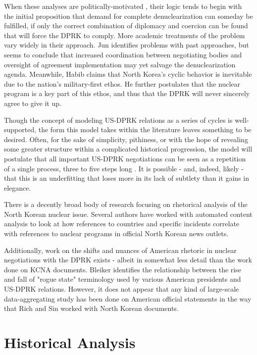 \documentclass{article}
\begin{document}
When these analyses are politically-motivated \cite{blair, cfr}, their logic tends to begin with the initial proposition that demand for complete denuclearization can someday be fulfilled, if only the correct combination of diplomacy and coercion can be found that will force the DPRK to comply. More academic treatments of the problem \cite{habib,jun} vary widely in their approach. Jun \cite{jun} identifies problems with past approaches, but seems to conclude that increased coordination between negotiating bodies and oversight of agreement implementation may yet salvage the denuclearization agenda. Meanwhile, Habib \cite{habib} claims that North Korea’s cyclic behavior is inevitable due to the nation’s military-first ethos. He further postulates that the nuclear program is a key part of this ethos, and thus that the DPRK will never sincerely agree to give it up.

Though the concept of modeling US-DPRK relations as a series of cycles is well-supported, the form this model takes within the literature leaves something to be desired. Often, for the sake of simplicity, pithiness, or with the hope of revealing some greater structure within a complicated historical progression, the model will postulate that all important US-DPRK negotiations can be seen as a repetition of a single process, three to five steps long \cite{fisher,jun}. It is possible - and, indeed, likely - that this is an underfitting that loses more in its lack of subtlety than it gains in elegance.

There is a decently broad body of research focusing on rhetorical analysis of the North Korean nuclear issue. Several authors \cite{rich12, rich14, sin} have worked with automated content analysis to look at how references to countries and specific incidents correlate with references to nuclear programs in official North Korean news outlets.

Additionally, work on the shifts and nuances of American rhetoric in nuclear negotiations with the DPRK exists - albeit in somewhat less detail than the work done on KCNA documents. Bleiker \cite{bleiker} identifies the relationship between the rise and fall of "rogue state" terminology used by various American presidents and US-DPRK relations. However, it does not appear that any kind of large-scale data-aggregating study has been done on American official statements in the way that Rich \cite{rich12, rich14} and Sin \cite{sin} worked with North Korean documents.

\section{Historical Analysis}
\end{document}
